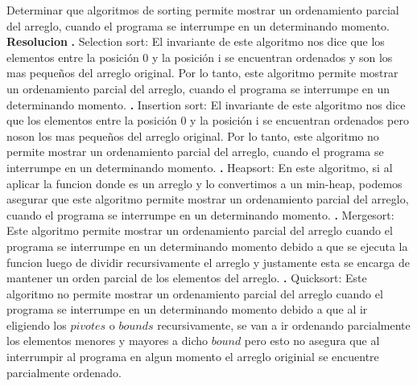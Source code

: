 \documentclass[10pt,a4paper]{article}
\begin{document}
Determinar que algoritmos de sorting permite mostrar un ordenamiento parcial del arreglo, cuando el programa se interrumpe en un determinando momento. 
\newline
\newline
\textbf{Resolucion}
\newline
\newline
\textbf{.} Selection sort: El invariante de este algoritmo nos dice que los elementos entre la posición 0 y la posición i se encuentran ordenados y son los mas pequeños del arreglo original. Por lo tanto, este algoritmo permite mostrar un ordenamiento parcial del arreglo, cuando el programa se interrumpe en un determinando momento. 
\newline
\newline
\textbf{.} Insertion sort: El invariante de este algoritmo nos dice que los elementos entre la posición 0 y la posición i se encuentran ordenados pero noson los mas pequeños del arreglo original. Por lo tanto, este algoritmo no permite mostrar un ordenamiento parcial del arreglo, cuando el programa se interrumpe en un determinando momento.
\newline
\newline
\textbf{.} Heapsort: En este algoritmo, si al aplicar la funcion  donde  es un arreglo y lo convertimos a un min-heap, podemos asegurar que este algoritmo permite mostrar un ordenamiento parcial del arreglo, cuando el programa se interrumpe en un determinando momento.
\newline
\newline
\textbf{.} Mergesort: Este algoritmo permite mostrar un ordenamiento parcial del arreglo cuando el programa se interrumpe en un determinando momento debido a que se ejecuta la funcion  luego de dividir recursivamente el arreglo y justamente esta se encarga de mantener un orden parcial de los elementos del arreglo.
\newline
\newline
\textbf{.} Quicksort: Este algoritmo no permite mostrar un ordenamiento parcial del arreglo cuando el programa se interrumpe en un determinando momento debido a que al ir eligiendo los $pivotes$ o $bounds$ recursivamente, se van a ir ordenando parcialmente los elementos menores y mayores a dicho $bound$ pero esto no asegura que al interrumpir al programa en algun momento el arreglo originial se encuentre parcialmente ordenado.
\newpage
\end{document}
